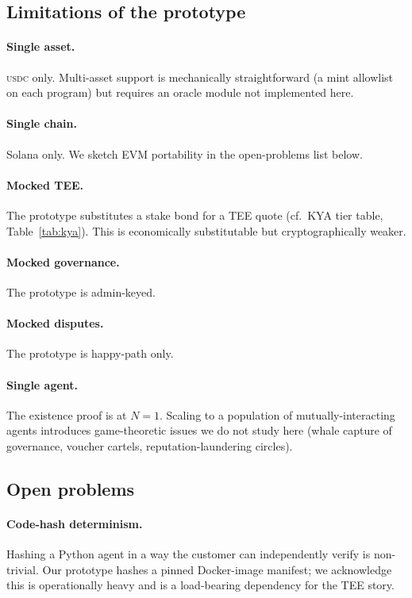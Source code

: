 \documentclass[10pt,conference,letterpaper]{IEEEtran}
\theoremstyle{definition}
\newcommand{\USDC}{\textsc{usdc}}
\begin{document}
\subsection{Limitations of the prototype}

\paragraph{Single asset.} \USDC{} only. Multi-asset support is
mechanically straightforward (a mint allowlist on each program) but
requires an oracle module not implemented here.

\paragraph{Single chain.} Solana only. We sketch EVM portability in
the open-problems list below.

\paragraph{Mocked TEE.} The prototype substitutes a stake bond for a
TEE quote (cf.\ KYA tier table, Table~\ref{tab:kya}). This is
economically substitutable but cryptographically weaker.

\paragraph{Mocked governance.} The prototype is admin-keyed.

\paragraph{Mocked disputes.} The prototype is happy-path only.

\paragraph{Single agent.} The existence proof is at $N=1$. Scaling to
a population of mutually-interacting agents introduces game-theoretic
issues we do not study here (whale capture of governance, voucher
cartels, reputation-laundering circles).

\subsection{Open problems}

\paragraph{Code-hash determinism.} Hashing a Python agent in a way the
customer can independently verify is non-trivial. Our prototype hashes
a pinned Docker-image manifest; we acknowledge this is operationally
heavy and is a load-bearing dependency for the TEE story.
\end{document}
